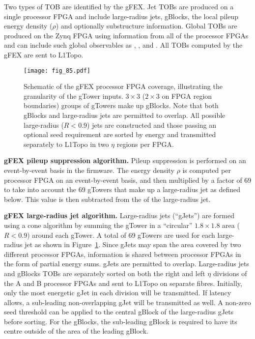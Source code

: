 \documentclass[cernpreprint, atlasdraft=false, UKenglish,british,orcidlogo, texmf, orcidlogo]{atlasdoc}
\begin{document}
 
Two types of \gls{TOB} are identified by the \gls{gFEX}.  Jet \glspl{TOB} are produced on a single processor \gls{FPGA} and include large-radius jets, gBlocks, the local pileup energy density ($\rho$) and optionally substructure information.
Global \glspl{TOB} are produced on the Zynq \gls{FPGA} using information from all of the processor \glspl{FPGA} and can include such global observables as  \MET, \sumET, and \HT.  All \glspl{TOB} computed by the \gls{gFEX} are sent to \gls{L1Topo}.
 
\begin{figure}[htbp]
\centerline{\texttt{[image: fig\_85.pdf]}}
\caption{Schematic of the \gls{gFEX} processor \gls{FPGA} coverage, illustrating the granularity of the gTower inputs.  $3 \times 3$ ($2 \times 3$ on \gls{FPGA} region boundaries)  groups of gTowers make up gBlocks.  Note that both gBlocks and large-radius jets  are permitted to overlap.
All possible  large-radius ($R < 0.9$) jets are constructed and those passing an optional seed requirement are sorted by energy and transmitted separately to \gls{L1Topo} in two
$\eta$ regions per \gls{FPGA}.
}
\label{fig:TDAQL1CalogFEXgTowers}
\end{figure}
 
\textbf{\gls{gFEX} pileup suppression algorithm.}  Pileup suppression is performed on an event-by-event basis in the firmware. The energy density $\rho$ is computed per processor \gls{FPGA} on an event-by-event basis, and then multiplied by a factor of 69 to take into account the 69 gTowers that make up a large-radius jet as defined below. This value is then subtracted from the \ET of the large-radius jet.
 
\textbf{\gls{gFEX} large-radius jet algorithm.}  Large-radius jets (``gJets'') are formed using a cone algorithm by summing the gTower \ET in a ``circular'' $1.8 \times 1.8$ area ($R < 0.9$) around each gTower.
A total of 69 gTowers are used for each large-radius jet as shown in Figure~\ref{fig:TDAQL1CalogFEXgTowers}.
Since gJets may span the area covered by two different processor \glspl{FPGA}, information is shared between processor \glspl{FPGA} in the form of partial energy sums. gJets are permitted to overlap.
Large-radius jets  and gBlocks \glspl{TOB} are separately sorted on both the right and left $\eta$ divisions of the A and B  processor  \glspl{FPGA} and sent to \gls{L1Topo} on separate fibres.
Initially, only the most energetic gJet in each division will be transmitted.
If latency allows, a sub-leading non-overlapping gJet will be transmitted as well.
A non-zero seed threshold can be applied to the central gBlock of the large-radius gJets before sorting.  For the gBlocks, the sub-leading gBlock is required to have its centre outside of the area of the leading gBlock.
 
\end{document}
